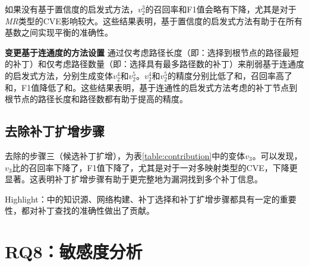 如果没有基于置信度的启发式方法，$v_2^3$的召回率和F1值会略有下降，尤其是对于\textit{MR}类型的CVE影响较大。这些结果表明，基于置信度的启发式方法有助于在所有基数之间实现平衡的准确性。

\textbf{变更基于连通度的方法设置}
通过仅考虑路径长度（即：选择到根节点的路径最短的补丁）和仅考虑路径数量（即：选择具有最多路径数的补丁）来削弱基于连通度的启发式方法，分别生成变体$v_2^4$和$v_2^5$。$v_2^4$和$v_2^5$的精度分别比\tool 低了和，召回率高了和，F1值降低了和。这些结果表明，基于连通性的启发式方法考虑的补丁节点到根节点的路径长度和路径数都有助于提高\tool 的精度。

\subsection{去除补丁扩增步骤}
去除\tool 的步骤三（候选补丁扩增），为表\ref{table:contribution}中的变体$v_3$。可以发现，$v_3$比\tool 的召回率下降了，F1值下降了，尤其是对于一对多映射类型的CVE，下降更显著。这表明补丁扩增步骤有助于更完整地为漏洞找到多个补丁信息。

\begin{tcolorbox}[size=title,opacityfill=0.15]
Highlight：\tool 中的知识源、网络构建、补丁选择和补丁扩增步骤都具有一定的重要性，都对\tool  补丁查找的准确性做出了贡献。
\end{tcolorbox}

\section{RQ8：敏感度分析}\label{sec:sensitivity}



